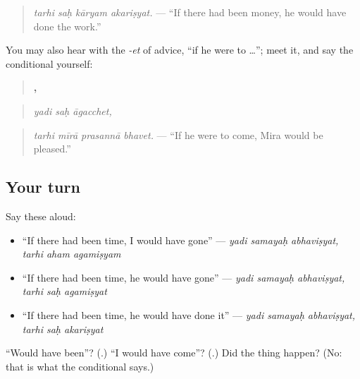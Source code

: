 \begin{quote}
\textbf{   }
\end{quote}

\begin{quote}
\emph{tarhi saḥ kāryam akariṣyat.} — \textquotedblleft{}If there had been money, he would have done the work.\textquotedblright{}
\end{quote}

You may also hear \textbf{} with the \emph{-et} of advice, \textquotedblleft{}if he were to …\textquotedblright{}; meet it, and say the conditional yourself:

\begin{quote}
\textbf{  ,}
\end{quote}

\begin{quote}
\emph{yadi saḥ āgacchet,}
\end{quote}

\begin{quote}
\textbf{   }
\end{quote}

\begin{quote}
\emph{tarhi mīrā prasannā bhavet.} — \textquotedblleft{}If he were to come, Mira would be pleased.\textquotedblright{}
\end{quote}

\subsection*{Your turn}
Say these aloud:

\begin{itemize}
\raggedright
  \item \textquotedblleft{}If there had been time, I would have gone\textquotedblright{} — \emph{yadi samayaḥ abhaviṣyat, tarhi aham agamiṣyam}
  \item \textquotedblleft{}If there had been time, he would have gone\textquotedblright{} — \emph{yadi samayaḥ abhaviṣyat, tarhi saḥ agamiṣyat}
  \item \textquotedblleft{}If there had been time, he would have done it\textquotedblright{} — \emph{yadi samayaḥ abhaviṣyat, tarhi saḥ akariṣyat}
\end{itemize}

\begin{tcolorbox}[breakable,colback=teal!4,colframe=teal!35!black,title={Before you move on}]
\textquotedblleft{}Would have been\textquotedblright{}? (\textbf{}.) \textquotedblleft{}I would have come\textquotedblright{}? (\textbf{}.) Did the thing happen? (No: that is what the conditional says.)
\end{tcolorbox}
